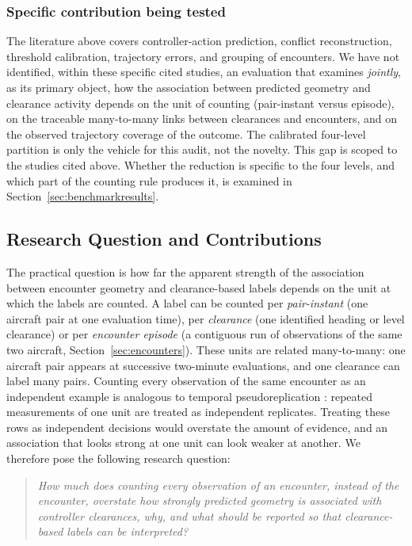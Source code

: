 \documentclass[aerospace,article,submit,moreauthors]{Definitions/mdpi}
\begin{document}
\subsubsection{Specific contribution being tested}
The literature above covers controller-action prediction, conflict reconstruction, threshold calibration, trajectory errors, and grouping of encounters. We have not identified, within these specific cited studies, an evaluation that examines \emph{jointly}, as its primary object, how the association between predicted geometry and clearance activity depends on the unit of counting (pair-instant versus episode), on the traceable many-to-many links between clearances and encounters, and on the observed trajectory coverage of the outcome. The calibrated four-level partition is only the vehicle for this audit, not the novelty. This gap is scoped to the studies cited above. Whether the reduction is specific to the four levels, and which part of the counting rule produces it, is examined in Section~\ref{sec:benchmarkresults}.

\subsection{Research Question and Contributions}
The practical question is how far the apparent strength of the association between encounter geometry and clearance-based labels depends on the unit at which the labels are counted. A label can be counted per \emph{pair-instant} (one aircraft pair at one evaluation time), per \emph{clearance} (one identified heading or level clearance) or per \emph{encounter episode} (a contiguous run of observations of the same two aircraft, Section~\ref{sec:encounters}). These units are related many-to-many: one aircraft pair appears at successive two-minute evaluations, and one clearance can label many pairs. Counting every observation of the same encounter as an independent example is analogous to temporal pseudoreplication \cite{hurlbert1984}: repeated measurements of one unit are treated as independent replicates. Treating these rows as independent decisions would overstate the amount of evidence, and an association that looks strong at one unit can look weaker at another. We therefore pose the following research question:
\begin{quote}
\emph{How much does counting every observation of an encounter, instead of the encounter, overstate how strongly predicted geometry is associated with controller clearances, why, and what should be reported so that clearance-based labels can be interpreted?}
\end{quote}
\end{document}
